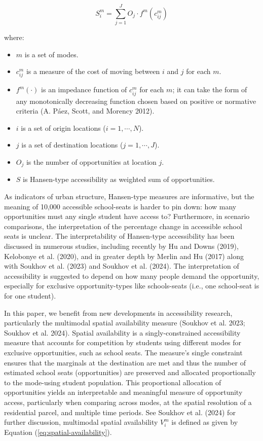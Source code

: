 \documentclass[
default
]{sn-jnl}
\providecommand{\tightlist}{%
  \setlength{\itemsep}{0pt}\setlength{\parskip}{0pt}}\usepackage{longtable,booktabs,array}
\begin{document}
\begin{equation}
\label{eq:multimodal-conventional-accessibility}
S_i^m = \sum_{j=1}^JO_j \cdot f^m(c_{ij}^m)
\end{equation}

\noindent where:

\begin{itemize}
\tightlist
\item
  \(m\) is a set of modes.
\item
  \(c_{ij}^m\) is a measure of the cost of moving between \(i\) and
  \(j\) for each \(m\).
\item
  \(f^m(\cdot)\) is an impedance function of \(c_{ij}^m\) for each
  \(m\); it can take the form of any monotonically decreasing function
  chosen based on positive or normative criteria (A. Páez, Scott, and
  Morency 2012).
\item
  \(i\) is a set of origin locations (\(i = 1,\cdots,N\)).
\item
  \(j\) is a set of destination locations (\(j = 1,\cdots,J\)).
\item
  \(O_j\) is the number of opportunities at location \(j\).
\item
  \(S\) is Hansen-type accessibility as weighted sum of opportunities.
\end{itemize}

As indicators of urban structure, Hansen-type measures are informative,
but the meaning of 10,000 accessible school-seats is harder to pin down:
how many opportunities must any single student have access to?
Furthermore, in scenario comparisons, the interpretation of the
percentage change in accessible school seats is unclear. The
interpretability of Hansen-type accessibility has been discussed in
numerous studies, including recently by Hu and Downs (2019), Kelobonye
et al. (2020), and in greater depth by Merlin and Hu (2017) along with
Soukhov et al. (2023) and Soukhov et al. (2024). The interpretation of
accessibility is suggested to depend on how many people demand the
opportunity, especially for exclusive opportunity-types like
schools-seats (i.e., one school-seat is for one student).

In this paper, we benefit from new developments in accessibility
research, particularly the multimodal spatial availability measure
(Soukhov et al. 2023; Soukhov et al. 2024). Spatial availability is a
singly-constrained accessibility measure that accounts for competition
by students using different modes for exclusive opportunities, such as
school seats. The measure's single constraint ensures that the marginals
at the destination are met and thus the number of estimated school seats
(opportunities) are preserved and allocated proportionally to the
mode-using student population. This proportional allocation of
opportunities yields an interpretable and meaningful measure of
opportunity access, particularly when comparing across modes, at the
spatial resolution of a residential parcel, and multiple time periods.
See Soukhov et al. (2024) for further discussion, multimodal spatial
availability \(V_{i}^m\) is defined as given by Equation
(\ref{eq:spatial-availability}).
\end{document}
